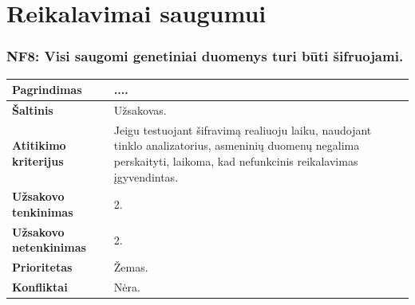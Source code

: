 \documentclass[12pt]{article}
\begin{document}
\section{Reikalavimai saugumui}

\subsubsection*{NF8: Visi saugomi genetiniai duomenys turi būti šifruojami.}
\label{sec:NF8}
\begin{table}[htb!]
    \captionsetup{justification=centering}
    \begin{tabular}{|m{4.9cm}|m{11cm}|}
        \hline
        \raggedleft \textbf{\cellcolor{deepchampagne}Pagrindimas} &
        .... \\
        \hline
        \raggedleft \textbf{\cellcolor{deepchampagne}Šaltinis} & Užsakovas. \\
        \hline
        \raggedleft \textbf{\cellcolor{deepchampagne}Atitikimo kriterijus} & 
        Jeigu testuojant šifravimą realiuoju laiku, naudojant tinklo
        analizatorius, asmeninių duomenų negalima perskaityti, laikoma, kad
        nefunkcinis reikalavimas įgyvendintas. \\
        \hline
        \raggedleft \textbf{\cellcolor{deepchampagne}Užsakovo tenkinimas} & 2. \\
        \hline
        \raggedleft \textbf{\cellcolor{deepchampagne}Užsakovo netenkinimas} & 2. \\
        \hline
        \raggedleft \textbf{\cellcolor{deepchampagne}Prioritetas} & Žemas. \\
        \hline
        \raggedleft \textbf{\cellcolor{deepchampagne}Konfliktai} & Nėra. \\
        \hline
    \end{tabular}
\end{table}

\newpage
\end{document}
